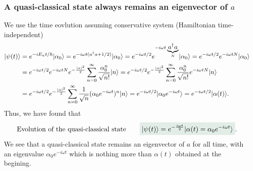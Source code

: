 \subsubsection{A quasi-classical state always remains an eigenvector of $a$}
We use the time eovlution assuming conservative system (Hamiltonian time-independent)
\begin{align*}
    |\psi(t)\rangle&=e^{-iE_nt/\hbar}|\alpha_0\rangle=e^{-i\omega t(a^\dagger a+1/2)}|\alpha_0\rangle=e^{-i\omega t/2}e^{-i\omega t \underbrace{a^\dagger a}_{N}}|\alpha_0\rangle=e^{-i\omega t/2}e^{-i\omega tN}|\alpha_0\rangle\\
    &=e^{-i\omega t/2}e^{-i\omega tN}e^{-\frac{|\alpha|^2}{2}}\sum_{n=0}^\infty\frac{\alpha_0^n}{\sqrt{n!}}|n\rangle=e^{-i\omega t/2}e^{-\frac{|\alpha|^2}{2}}\sum_{n=0}^\infty\frac{\alpha_0^n}{\sqrt{n!}}e^{-i\omega tN}|n\rangle\\
    &=e^{-i\omega t/2}e^{-\frac{|\alpha|^2}{2}}\sum_{n=0}^\infty\frac{1}{\sqrt{n}}(\alpha_0e^{-i\omega t})^n|n\rangle=e^{-i\omega t/2}|\alpha_0e^{-i\omega t}\rangle=e^{-i\omega t/2}|\alpha(t)\rangle.
\end{align*} 
Thus, we have found that 
\begin{align}
    \text{Evolution of the quasi-classical state}\qquad\highlight{\ket{\psi(t)}=e^{-\frac{i\omega t}{2}}\ket{\alpha(t)=\alpha_0e^{-i\omega t}}}.
    \label{eq:evolcoherentstate}
\end{align}
We see that a quasi-classical state remains an eigenvector of $a$ for all time, with an eigenvalue $\alpha_0e^{-i\omega t}$ which is nothing more than $\alpha(t)$ obtained at the begining.
%
